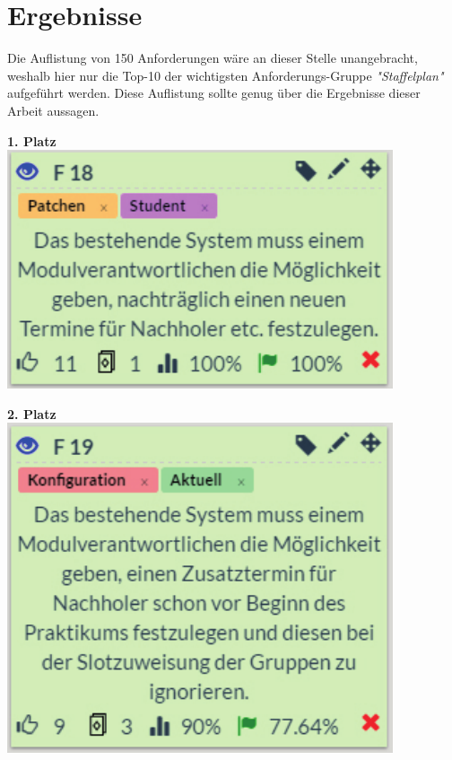 
\chapter{Ergebnisse}

Die Auflistung von 150 Anforderungen wäre an dieser Stelle unangebracht, weshalb hier nur die Top-10 der wichtigsten Anforderungs-Gruppe \textit{"Staffelplan"} aufgeführt werden. Diese Auflistung sollte genug über die Ergebnisse dieser Arbeit aussagen.\\


\begin{minipage}[t]{.5\textwidth}
	\centering
   		\textbf{1. Platz}\\
   		\vspace{16pt}
		\includegraphics[width=\textwidth]{images/1.pdf}
\end{minipage}
\begin{minipage}[t]{.5\textwidth}
	\centering
   		\textbf{2. Platz}\\
   		\vspace{16pt}
		\includegraphics[width=\textwidth]{images/2.pdf}
\end{minipage}




